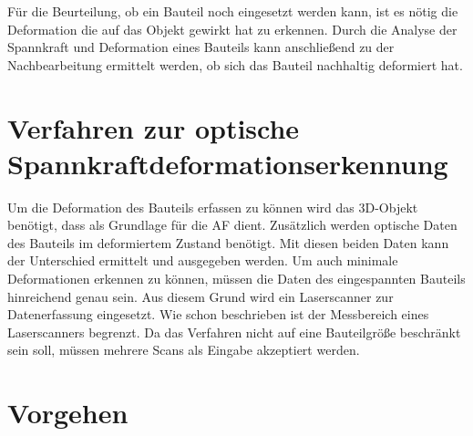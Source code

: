 Für die Beurteilung, ob ein Bauteil noch eingesetzt werden kann, ist es nötig die 
Deformation die auf das Objekt gewirkt hat zu erkennen. Durch die Analyse der Spannkraft 
und Deformation eines Bauteils kann anschließend zu der Nachbearbeitung ermittelt werden, 
ob sich das Bauteil nachhaltig deformiert hat.

\section{Verfahren zur optische Spannkraftdeformationserkennung}

Um die Deformation des Bauteils erfassen zu können wird das 3D-Objekt benötigt, 
dass als Grundlage für die AF dient. Zusätzlich werden optische Daten des Bauteils 
im deformiertem Zustand benötigt. Mit diesen beiden Daten kann der Unterschied 
ermittelt und ausgegeben werden.
Um auch minimale Deformationen erkennen zu können, müssen die Daten des 
eingespannten Bauteils hinreichend genau sein. Aus diesem Grund wird ein Laserscanner zur 
Datenerfassung eingesetzt.
Wie schon beschrieben ist der Messbereich eines Laserscanners begrenzt. Da das 
Verfahren nicht auf eine Bauteilgröße beschränkt sein soll, müssen mehrere Scans als 
Eingabe akzeptiert werden.

\section{Vorgehen}

